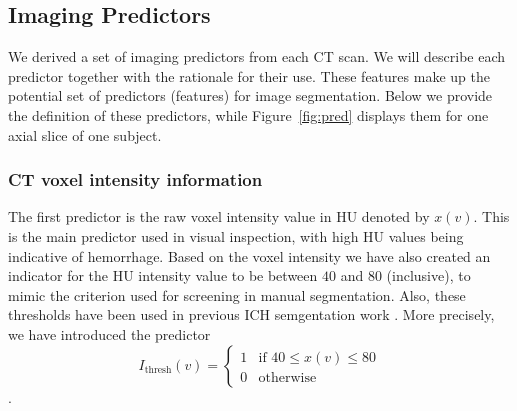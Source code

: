 \documentclass{elsarticle_nonatbib}\usepackage[]{graphicx}\usepackage[]{color}
\begin{document}



\subsection{Imaging Predictors}
\label{sec:predictors}
We derived a set of imaging predictors from each CT scan.  We will describe each predictor together with the rationale for their use.  These features make up the potential set of predictors (features) for image segmentation.  Below we provide the definition of these predictors, while Figure~\ref{fig:pred} displays them for one axial slice of one subject.

\subsubsection{CT voxel intensity information} The first predictor is the raw voxel intensity value in HU denoted by $x(v)$. This is the main predictor used in visual inspection, with high HU values being indicative of hemorrhage. Based on the voxel intensity we have also created an indicator for the HU intensity value to be between $40$ and $80$ (inclusive), to mimic the criterion used for screening in manual segmentation. Also, these thresholds have been used in previous ICH semgentation work \citep{prakash_segmentation_2012}. More precisely, we have introduced the predictor $$
I_{\text{thresh}}(v) = \begin{cases}
1 & \text{if } 40 \leq x(v) \leq 80 \\
0 & \text{otherwise}
\end{cases}
$$.
\end{document}
